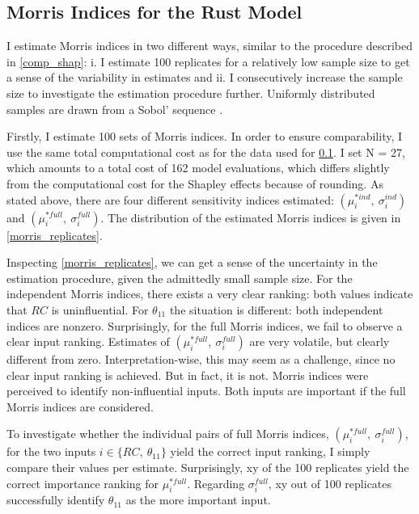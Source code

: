 \subsection{Morris Indices for the Rust Model}

I estimate Morris indices in two different ways, similar to the procedure described in \cref{comp_shap}: i. I estimate 100 replicates for a relatively low sample size to get a sense of the variability in estimates and ii. I consecutively increase the sample size to investigate
the estimation procedure further. Uniformly distributed samples are drawn from a Sobol'
sequence \citep{S76}.

Firstly, I estimate 100 sets of Morris indices. In order to ensure comparability, I use the same total computational cost as for the data used for \cref{}. I set N = 27, which amounts
to a total cost of 162 model evaluations, which differs slightly from the computational
cost for the Shapley effects because of rounding. As stated above, there are four different
sensitivity indices estimated: $(\mu^{\ast ind}_i,\ \sigma_i^{ind})$ and $(\mu^{\ast full}_i,\ \sigma_i^{full})$. The distribution of the
estimated Morris indices is given in \cref{morris_replicates}.

Inspecting \cref{morris_replicates}, we can get a sense of the uncertainty in the estimation procedure,
given the admittedly small sample size. For the independent Morris indices, there exists a
very clear ranking: both values indicate that $RC$ is uninfluential. For $\theta_{11}$ the situation is
different: both independent indices are nonzero. Surprisingly, for the full Morris indices,
we fail to observe a clear input ranking. Estimates of $(\mu^{\ast full}_i,\ \sigma_i^{full})$ are very volatile, but
clearly different from zero. Interpretation-wise, this may seem as a challenge, since no
clear input ranking is achieved. But in fact, it is not. Morris indices were perceived to
identify non-influential inputs. Both inputs are important if the full Morris indices are
considered.

To investigate whether the individual pairs of full Morris indices, $(\mu^{\ast full}_i,\ \sigma_i^{full})$, for the
two inputs $i \in \{RC,\ \theta_{11}\}$ yield the correct input ranking, I simply compare their values
per estimate. Surprisingly, xy of the 100 replicates yield the correct importance ranking
for $\mu^{\ast full}_i$. Regarding $\sigma_i^{full}$, xy out of 100 replicates successfully identify $\theta_{11}$ as the more
important input.

